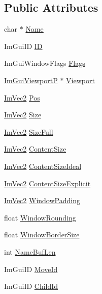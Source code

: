 \subsection*{Public Attributes}
\begin{DoxyCompactItemize}
\item 
char $\ast$ \hyperlink{structImGuiWindow_ab44252eb7d02d3f38249f5bac605037c}{Name}
\item 
Im\+Gui\+ID \hyperlink{structImGuiWindow_a5976b8d78bcc543ad7f23561f5cf0b8f}{ID}
\item 
Im\+Gui\+Window\+Flags \hyperlink{structImGuiWindow_a7c29e810a533b9a647cce5d93d45057f}{Flags}
\item 
\hyperlink{structImGuiViewportP}{Im\+Gui\+ViewportP} $\ast$ \hyperlink{structImGuiWindow_ab48fb3ce73e23f55ba883e368e20c607}{Viewport}
\item 
\hyperlink{structImVec2}{Im\+Vec2} \hyperlink{structImGuiWindow_a1453f685401a44f76256fb54a4aac451}{Pos}
\item 
\hyperlink{structImVec2}{Im\+Vec2} \hyperlink{structImGuiWindow_a876e7aaf4cd824c8956238fba61387d5}{Size}
\item 
\hyperlink{structImVec2}{Im\+Vec2} \hyperlink{structImGuiWindow_ac3c7eb6b9cd556d56210cbb37caf0c74}{Size\+Full}
\item 
\hyperlink{structImVec2}{Im\+Vec2} \hyperlink{structImGuiWindow_a6bf8fd3127085039448363101cf3531b}{Content\+Size}
\item 
\hyperlink{structImVec2}{Im\+Vec2} \hyperlink{structImGuiWindow_aaee3ede30f1972506a3b19ae5c424790}{Content\+Size\+Ideal}
\item 
\hyperlink{structImVec2}{Im\+Vec2} \hyperlink{structImGuiWindow_aa87836746dbdb77de62961406624968d}{Content\+Size\+Explicit}
\item 
\hyperlink{structImVec2}{Im\+Vec2} \hyperlink{structImGuiWindow_a538d3d70ad8f71a4ec58a6a0560b2f02}{Window\+Padding}
\item 
float \hyperlink{structImGuiWindow_a871ebbbfdf354600a3833c270d6e6ef4}{Window\+Rounding}
\item 
float \hyperlink{structImGuiWindow_ad51248766b9a815ce20b0d11e13b42b0}{Window\+Border\+Size}
\item 
int \hyperlink{structImGuiWindow_a1e2593b079e43c3603d999474ea84ab6}{Name\+Buf\+Len}
\item 
Im\+Gui\+ID \hyperlink{structImGuiWindow_a680ac2168da85f59c35de8f0813224d6}{Move\+Id}
\item 
Im\+Gui\+ID \hyperlink{structImGuiWindow_a15e577eef56b4cb52424a989a4a8bc8a}{Child\+Id}

\end{DoxyCompactItemize}
